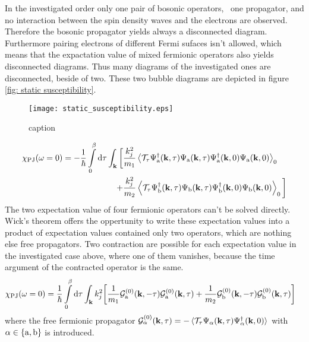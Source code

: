 In the investigated order only one pair of bosonic operators, \ie\, one propagator, and no interaction between the spin density waves and the electrons are observed.
Therefore the bosonic propagator yields always a disconnected diagram.
Furthermore pairing electrons of different Fermi sufaces isn't allowed, which means that the expactation value of mixed fermionic operators also yields disconnected diagrams.
Thus many diagrams of the investigated ones are disconnected, beside of two.
These two bubble diagrams are depicted in figure \ref{fig: static susceptibility}.
%
\begin{figure}
	\centering
	\texttt{[image: static\_susceptibility.eps]}
	\caption{caption}
	\label{fig:static susceptibility}
\end{figure}
%
%
\begin{align}
	\chi_{\mathrm{PJ}}(\omega = 0) = 
		-\frac{1}{\hbar} 
		\int\limits_{0}^{\beta} \dd{\tau} 
		\int_{\vb{k}}
		\bigg[
			&\frac{k_{j}^{2}}{m_{1}}
			\expval{
				\mathcal{T}_{\tau}
				\Psi_{\mathrm{a}}^{\dag}(\vb{k},\tau)
				\Psi_{\mathrm{a}}(\vb{k},\tau)
				\Psi_{\mathrm{a}}^{\dag}(\vb{k},0)
				\Psi_{\mathrm{a}}(\vb{k},0)
			}_{0}
			\notag \\ +
			&\frac{k_{j}^{2}}{m_{2}}
			\expval{
				\mathcal{T}_{\tau}
				\Psi_{\mathrm{b}}^{\dag}(\vb{k},\tau)
				\Psi_{\mathrm{b}}(\vb{k},\tau)
				\Psi_{\mathrm{b}}^{\dag}(\vb{k},0)
				\Psi_{\mathrm{b}}(\vb{k},0)
			}_{0}
		\bigg]
\end{align}
%
The two expectation value of four fermionic operators can't be solved directly.
Wick's theorem offers the oppertunity to write these expectation values into a product of expectation values contained only two operators, which are nothing else free propagators.
Two contraction are possible for each expectation value in the investigated case above, where one of them vanishes, because the time argument of the contracted operator is the same.
%
\begin{align}
	\chi_{\mathrm{PJ}}(\omega = 0) &= 
		\frac{1}{\hbar} 
		\int\limits_{0}^{\beta} \dd{\tau} 
		\int_{\vb{k}} 
		k_{j}^{2}
		\bigg[
			\frac{1}{m_{1}}
			\mathcal{G}_{\mathrm{a}}^{(0)}(\vb{k},-\tau)
			\mathcal{G}_{\mathrm{a}}^{(0)}(\vb{k},\tau)
			+
			\frac{1}{m_{2}}
			\mathcal{G}_{\mathrm{b}}^{(0)}(\vb{k},-\tau)
			\mathcal{G}_{\mathrm{b}}^{(0)}(\vb{k},\tau)
		\bigg]
\end{align}
%
where the free fermionic propagator $\mathcal{G}_{\alpha}^{(0)}(\vb{k},\tau) = -\expval*{\mathcal{T}_{\tau} \Psi_{\alpha}(\vb{k},\tau) \Psi_{\alpha}^{\dag}(\vb{k},0)}$ with $\alpha \in \{\mathrm{a},\mathrm{b}\}$ is introduced.
